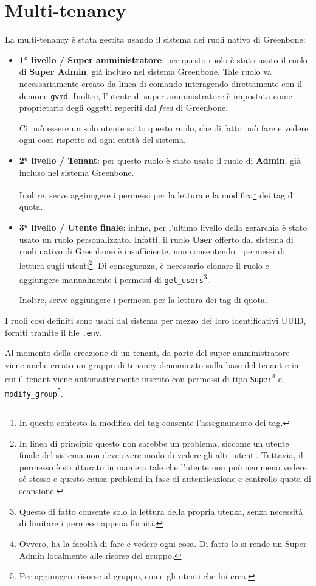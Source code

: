 \section{Multi-tenancy}
\label{roles}
La multi-tenancy è stata gestita usando il sistema dei ruoli nativo di Greenbone:
\begin{itemize}
    \item \textbf{1° livello / Super amministratore}: per questo ruolo è stato usato il ruolo di \textbf{Super Admin}, già incluso nel sistema Greenbone. Tale ruolo va necessariamente creato da linea di comando interagendo direttamente con il demone \texttt{gvmd}. Inoltre, l'utente di super amministratore è impostata come proprietario degli oggetti reperiti dal \emph{feed} di Greenbone.

    Ci può essere un solo utente sotto questo ruolo, che di fatto può fare e vedere ogni cosa rispetto ad ogni entità del sistema.
    \item \textbf{2° livello / Tenant}: per questo ruolo è stato usato il ruolo di \textbf{Admin}, già incluso nel sistema Greenbone.

    Inoltre, serve aggiungere i permessi per la lettura e la modifica\footnote{In questo contesto la modifica dei tag consente l'assegnamento dei tag.} dei tag di quota.
    \item \textbf{3° livello / Utente finale}: infine, per l'ultimo livello della gerarchia è stato usato un ruolo personalizzato. Infatti, il ruolo \textbf{User} offerto dal sistema di ruoli nativo di Greenbone è insufficiente, non consentendo i permessi di lettura sugli utenti\footnote{In linea di principio questo non sarebbe un problema, siccome un utente finale del sistema non deve avere modo di vedere gli altri utenti. Tuttavia, il permesso è strutturato in maniera tale che l'utente non può nemmeno vedere sé stesso e questo causa problemi in fase di autenticazione e controllo quota di scansione.}. Di conseguenza, è necessario clonare il ruolo e aggiungere manualmente i permessi di \texttt{get\_users}\footnote{Questo di fatto consente solo la lettura della propria utenza, senza necessità di limitare i permessi appena forniti.}.

    Inoltre, serve aggiungere i permessi per la lettura dei tag di quota.
\end{itemize}
I ruoli così definiti sono usati dal sistema per mezzo dei loro identificativi UUID, forniti tramite il file \texttt{.env}.

Al momento della creazione di un tenant, da parte del super amministratore viene anche creato un gruppo di tenancy denominato sulla base del tenant e in cui il tenant viene automaticamente inserito con permessi di tipo \texttt{Super}\footnote{Ovvero, ha la facoltà di fare e vedere ogni cosa. Di fatto lo si rende un Super Admin localmente alle risorse del gruppo.} e \texttt{modify\_group}\footnote{Per aggiungere risorse al gruppo, come gli utenti che lui crea.}.
    
